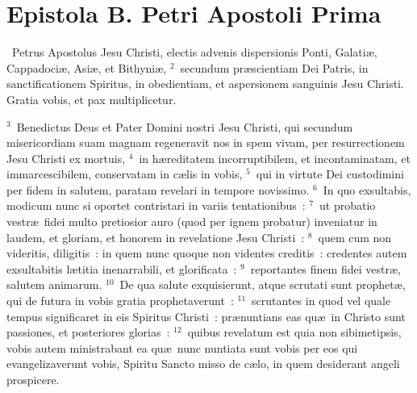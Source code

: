 {\centering \section*{Epistola B. Petri Apostoli Prima}}\thispagestyle{empty}

~\lettrine[lines=10,image=true,loversize=0.05,lraise=-0.03]{P}{}etrus Apostolus Jesu Christi, electis advenis dispersionis Ponti, Galati\ae , Cappadoci\ae , Asi\ae , et Bithyni\ae ,
${}^{2}$~secundum pr\ae scientiam Dei Patris, in sanctificationem Spiritus, in obedientiam, et aspersionem sanguinis Jesu Christi. Gratia vobis, et pax multiplicetur.


${}^{3}$~Benedictus Deus et Pater Domini nostri Jesu Christi, qui secundum misericordiam suam magnam regeneravit nos in spem vivam, per resurrectionem Jesu Christi ex mortuis,
${}^{4}$~in h\ae reditatem incorruptibilem, et incontaminatam, et immarcescibilem, conservatam in c\ae lis in vobis,
${}^{5}$~qui in virtute Dei custodimini per fidem in salutem, paratam revelari in tempore novissimo.
${}^{6}$~In quo exsultabis, modicum nunc si oportet contristari in variis tentationibus~:
${}^{7}$~ut probatio vestr\ae\ fidei multo pretiosior auro (quod per ignem probatur) inveniatur in laudem, et gloriam, et honorem in revelatione Jesu Christi~:
${}^{8}$~quem cum non videritis, diligitis~: in quem nunc quoque non videntes creditis~: credentes autem exsultabitis l\ae titia inenarrabili, et glorificata~:
${}^{9}$~reportantes finem fidei vestr\ae , salutem animarum.
${}^{10}$~De qua salute exquisierunt, atque scrutati sunt prophet\ae , qui de futura in vobis gratia prophetaverunt~:
${}^{11}$~scrutantes in quod vel quale tempus significaret in eis Spiritus Christi~: pr\ae nuntians eas qu\ae\ in Christo sunt passiones, et posteriores glorias~:
${}^{12}$~quibus revelatum est quia non sibimetipsis, vobis autem ministrabant ea qu\ae\ nunc nuntiata sunt vobis per eos qui evangelizaverunt vobis, Spiritu Sancto misso de c\ae lo, in quem desiderant angeli prospicere.


